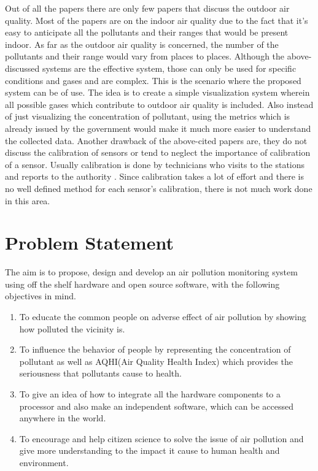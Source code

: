 \documentclass[11pt]{article}
\begin{document}
Out of all the papers there are only few papers that discuss the outdoor air quality. Most of the papers are on the indoor air quality due to the fact that it's easy to anticipate all the pollutants and their ranges that would be present indoor. As far as the outdoor air quality is concerned, the number of the pollutants and their range would vary from places to places. Although the above-discussed systems are the effective system, those can only be used for specific conditions and gases and are complex. This is the scenario where the proposed system can be of use. The idea is to create a simple visualization system wherein all possible gases which contribute to outdoor air quality is included. Also instead of just visualizing the concentration of pollutant, using the metrics which is already issued by the government would make it much more easier to understand the collected data. Another drawback of the above-cited papers are, they do not discuss the calibration of sensors or tend to neglect the importance of calibration of a sensor. Usually calibration is done by technicians who visits to the stations and reports to the authority \cite{Gov}. Since calibration takes a lot of effort and there is no well defined method for each sensor's calibration, there is not much work done in this area.


\newpage

\section{Problem Statement}

The aim is to propose, design and develop an air pollution monitoring system using off the shelf hardware and open source software, with the following objectives in mind.
\begin{enumerate}
\item To educate the common people on adverse effect of air pollution by showing how polluted the vicinity is.
\item To influence the behavior of people by representing the concentration of pollutant as well as AQHI(Air Quality Health Index) which provides the seriousness that pollutants cause to health.
\item To give an idea of how to integrate all the hardware components to a processor and also make an independent software, which can be accessed anywhere in the world.
\item To encourage and help citizen science to solve the issue of air pollution and give more understanding to the impact it cause to human health and environment.
\end{enumerate}
 
\end{document}

